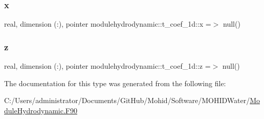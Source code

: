 \subsubsection{\texorpdfstring{x}{x}}
{\footnotesize\ttfamily real, dimension (\+:), pointer modulehydrodynamic\+::t\+\_\+coef\+\_\+1d\+::x =$>$ null()\hspace{0.3cm}{\ttfamily [private]}}

\mbox{\label{structmodulehydrodynamic_1_1t__coef__1d_a1aab07f4bf4aeca715e2b014e6dc3c1c}} 
\subsubsection{\texorpdfstring{z}{z}}
{\footnotesize\ttfamily real, dimension (\+:), pointer modulehydrodynamic\+::t\+\_\+coef\+\_\+1d\+::z =$>$ null()\hspace{0.3cm}{\ttfamily [private]}}



The documentation for this type was generated from the following file\+:\begin{DoxyCompactItemize}
\item 
C\+:/\+Users/administrator/\+Documents/\+Git\+Hub/\+Mohid/\+Software/\+M\+O\+H\+I\+D\+Water/\mbox{\hyperlink{_module_hydrodynamic_8_f90}{Module\+Hydrodynamic.\+F90}}\end{DoxyCompactItemize}
